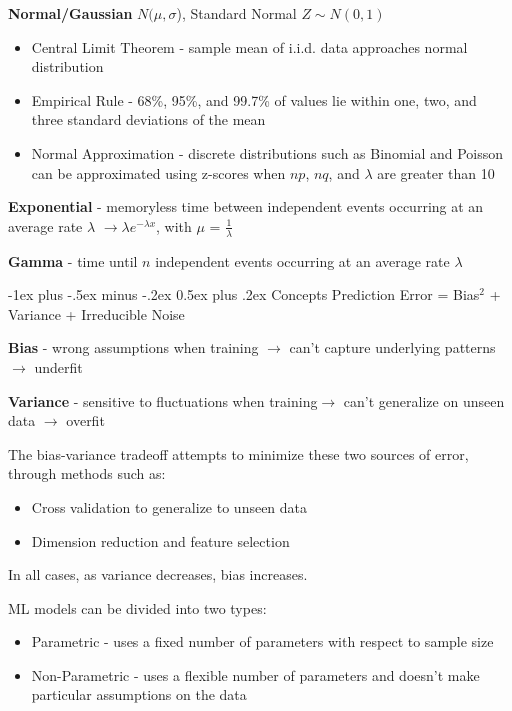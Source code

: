 \documentclass[10pt,landscape]{article}
\makeatletter
\renewcommand{\section}{\@startsection{section}{1}{0mm}%
                                {-1ex plus -.5ex minus -.2ex}%
                                {0.5ex plus .2ex}%
                                {\normalfont\large\bfseries}}
\makeatother
\begin{document}
\begin{multicols}{3}
\textbf{Normal/Gaussian} $N(\mu,\sigma$), Standard Normal $Z\sim N(0, 1)$

\begin{itemize}[label={--},leftmargin=4mm]
\itemsep -.4mm
\vspace{-.5mm}
\item Central Limit Theorem - sample mean of i.i.d. data approaches normal distribution
\item Empirical Rule - 68\%, 95\%, and 99.7\% of values lie within one, two, and three standard deviations of the mean
\item Normal Approximation - discrete distributions such as Binomial and Poisson can be approximated using z-scores when $np$, $nq$, and $\lambda$ are greater than 10
\end{itemize}

\textbf{Exponential} - memoryless time between independent events occurring at an average rate $\lambda$ $\to \lambda e^{-\lambda x}$, with $\mu$ = $\frac{1}{\lambda}$

\textbf{Gamma} - time until $n$ independent events occurring at an average rate $\lambda$

\section{Concepts}
Prediction Error = Bias$^2$ + Variance + Irreducible Noise

\textbf{Bias} - wrong assumptions when training $\to$ can't capture underlying patterns $\to$ underfit

\textbf{Variance} - sensitive to fluctuations when training$\to$ can't generalize on unseen data $\to$ overfit

The bias-variance tradeoff attempts to minimize these two sources of error, through methods such as:
\begin{itemize}[label={--},leftmargin=4mm]
\itemsep -.4mm
\vspace{-.5mm}
\item Cross validation to generalize to unseen data
\item Dimension reduction and feature selection
\end{itemize}
\vspace{-.5mm}
In all cases, as variance decreases, bias increases.

\vspace{.5mm}
ML models can be divided into two types:
\vspace{-.5mm}
\begin{itemize}[label={--},leftmargin=4mm]
    \itemsep -.4mm
    \item Parametric - uses a fixed number of parameters with respect to sample size
    \item Non-Parametric - uses a flexible number of parameters and doesn't make particular assumptions on the data
\end{itemize}


\end{multicols}
\end{document}
